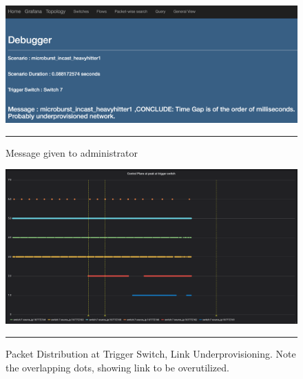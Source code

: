 \begin{figure}[htbp]
	\centering
		\includegraphics[width=1.0\columnwidth]{Figures/jindex_under.png}
		\rule{35em}{0.5pt}
	\caption[Debugger Home Page, Link Underprovisioning]{Message given to administrator}
	\label{fig:home_under}
\end{figure}
\begin{figure}[htbp]
	\centering
		\includegraphics[width=1.0\columnwidth]{Figures/distribution_under.png}
		\rule{35em}{0.5pt}
	\caption[Packet Distribution at Trigger Switch, Link Underprovisioning]{Packet Distribution at Trigger Switch, Link Underprovisioning. Note the overlapping dots, showing link to be overutilized.}
	\label{fig:distribution_under}
\end{figure}
